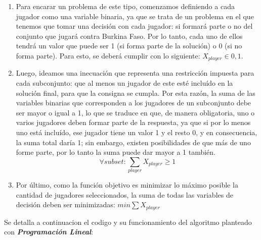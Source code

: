 \begin{enumerate}
    \item Para encarar un problema de este tipo, comenzamos definiendo a cada jugador como una variable binaria, ya que se trata de un problema en el que tenemos que tomar una decisión con cada jugador: si formará parte o no del conjunto que jugará contra Burkina Faso. Por lo tanto, cada uno de ellos tendrá un valor que puede ser 1 (si forma parte de la solución) o 0 (si no forma parte). Para esto, se deberá cumplir con lo siguiente: $X_{player} \in {0, 1}$.
    \item Luego, ideamos una inecuación que representa una restricción impuesta para cada subconjunto: que al menos un jugador de este esté incluído en la solución final, para que la consigna se cumpla. Por esta razón, la suma de las variables binarias que corresponden a los jugadores de un subconjunto debe ser mayor o igual a 1, lo que se traduce en que, de manera obligatoria, uno o varios jugadores deben formar parte de la respuesta, ya que si por lo menos uno está incluído, ese jugador tiene un valor 1 y el resto 0, y en consecuencia, la suma total daría 1; sin embargo, existen posibilidades de que más de uno forme parte, por lo tanto la suma puede dar mayor a 1 también.
    \[ \forall subset: \sum\limits_{player} X_{player} \geq 1 \]
    \item Por último, como la función objetivo es minimizar lo máximo posible la cantidad de jugadores seleccionados, la suma de todas las variables de decisión deben ser minimizadas: $min \sum X_{player}$
\end{enumerate}

Se detalla a continuacion el codigo y su funcionamiento del algoritmo planteado con \textbf{\textit{Programación Lineal}}:



